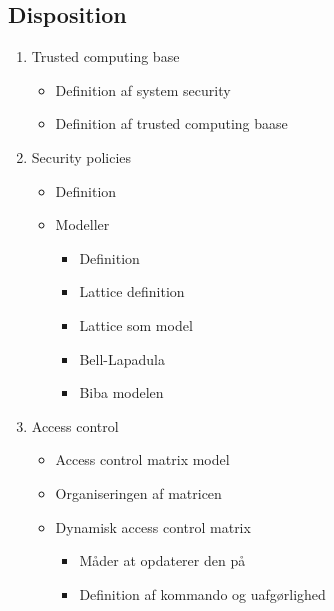 \documentclass[a4, english]{article}
\begin{document}
\subsection{Disposition}
\begin{enumerate}
	\item Trusted computing base
  \begin{itemize}
  	\item Definition af system security
    \item Definition af trusted computing baase
  \end{itemize}
  \item Security policies
  \begin{itemize}
  	\item Definition
    \item Modeller
    \begin{itemize}
    	\item Definition
      \item Lattice definition
      \item Lattice som model 
      \item Bell-Lapadula 
      \item Biba modelen
    \end{itemize}
  \end{itemize}
  \item Access control
  \begin{itemize}
  	\item Access control matrix model 
    \item Organiseringen af matricen
    \item Dynamisk access control matrix
    \begin{itemize}
    	\item Måder at opdaterer den på 
      \item Definition af kommando og uafgørlighed 
    \end{itemize}
  \end{itemize}
\end{enumerate}
\newpage
  
\end{document}
